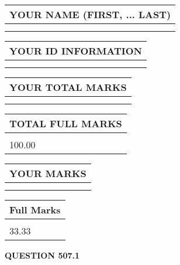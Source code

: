 \documentclass{ctexart}
\begin{document}
   
   
   
\newpage 
\setcounter{page}{ 
   507001 } 
   
   
   
   
\noindent\begin{tabular}{|l|}
\hline
YOUR NAME (FIRST, ... LAST)  \\
\hline
 \\ 
 \\ 
\hline
\end{tabular}
\hspace{0.05in} \begin{tabular}{|l|}
\hline
 YOUR   ID   INFORMATION  \\
\hline
 \\ 
 \\ 
\hline
\end{tabular}
   
   
\vspace{0.2in}\noindent\begin{tabular}{|l|}
\hline
YOUR TOTAL MARKS  \\
\hline
 \\ 
 \\ 
\hline
\end{tabular}
\hspace{0.05in} \begin{tabular}{|l|}
\hline
TOTAL FULL MARKS  \\
\hline
 \\ 
100.00 \\
\hline
\end{tabular}
   
   
 \vspace{0.2in}
 
 
 
 
   
   
  
\vspace{0.2in}
  
\noindent\begin{tabular}{|l|}
\hline
 YOUR MARKS  \\
\hline
 \\ 
 \\ 
\hline
\end{tabular}
\hspace{0.05in} \begin{tabular}{|l|}
\hline
 Full Marks  \\
\hline
 \\ 
33.33 \\
\hline
\end{tabular}
{\textbf{\Large{QUESTION
507.1 
}}}
  
\end{document}
